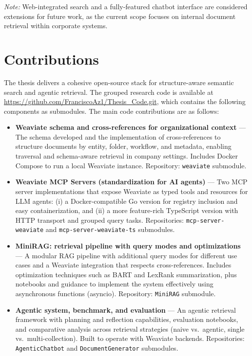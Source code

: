 \textit{Note:} Web-integrated search and a fully-featured chatbot interface are considered extensions for future work, as the current scope focuses on internal document retrieval within corporate systems.

\section{Contributions}
The thesis delivers a cohesive open-source stack for structure-aware semantic search and agentic retrieval. The grouped research code is available at \url{https://github.com/FranciscoAz1/Thesis_Code.git}, which contains the following components as submodules. The main code contributions are as follows:

\begin{itemize}
	\item \textbf{Weaviate schema and cross-references for organizational context} — The schema developed and the implementation of cross-references to structure documents by entity, folder, workflow, and metadata, enabling traversal and schema-aware retrieval in company settings. Includes Docker Compose to run a local Weaviate instance. Repository: \texttt{weaviate} submodule.

	\item \textbf{Weaviate MCP Servers (standardization for AI agents)} — Two \gls{MCP} server implementations that expose Weaviate as typed tools and resources for LLM agents: (i) a Docker-compatible Go version for registry inclusion and easy containerization, and (ii) a more feature-rich TypeScript version with HTTP transport and grouped query tasks. Repositories: \texttt{mcp-server-weaviate} and \texttt{mcp-server-weaviate-ts} submodules.

	\item \textbf{MiniRAG: retrieval pipeline with query modes and optimizations} — A modular RAG pipeline with additional query modes for different use cases and a Weaviate integration that respects cross-references. Includes optimization techniques such as BART and LexRank summarization, plus notebooks and guidance to implement the system effectively using asynchronous functions (asyncio). Repository: \texttt{MiniRAG} submodule.

	\item \textbf{Agentic system, benchmark, and evaluation} — An agentic retrieval framework with planning and reflection capabilities, evaluation notebooks, and comparative analysis across retrieval strategies (naive vs.\ agentic, single vs.\ multi-collection). Built to operate with Weaviate backends. Repositories: \texttt{AgenticChatbot} and \texttt{DocumentGenerator} submodules.
\end{itemize}


